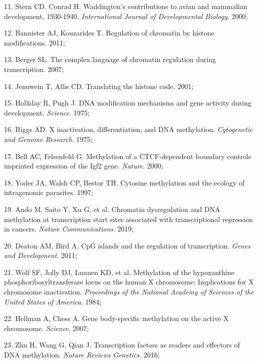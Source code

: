 \documentclass[11pt,twoside]{bristolthesis}
\newenvironment{cslreferences}%
  {}%
  {\par}
\begin{document}
\begin{cslreferences}
\leavevmode\hypertarget{ref-Stern2000}{}%
11. Stern CD. Conrad H. Waddington's contributions to avian and mammalian development, 1930-1940. \emph{International Journal of Developmental Biology}. 2000;

\leavevmode\hypertarget{ref-Bannister2011}{}%
12. Bannister AJ, Kouzarides T. Regulation of chromatin by histone modifications. 2011;

\leavevmode\hypertarget{ref-Berger2007}{}%
13. Berger SL. The complex language of chromatin regulation during transcription. 2007;

\leavevmode\hypertarget{ref-Jenuwein2001}{}%
14. Jenuwein T, Allis CD. Translating the histone code. 2001;

\leavevmode\hypertarget{ref-Holliday1975}{}%
15. Holliday R, Pugh J. DNA modification mechanisms and gene activity during development. \emph{Science}. 1975;

\leavevmode\hypertarget{ref-Riggs1975}{}%
16. Riggs AD. X inactivation, differentiation, and DNA methylation. \emph{Cytogenetic and Genome Research}. 1975;

\leavevmode\hypertarget{ref-Bell2000}{}%
17. Bell AC, Felsenfeld G. Methylation of a CTCF-dependent boundary controls imprinted expression of the Igf2 gene. \emph{Nature}. 2000;

\leavevmode\hypertarget{ref-Yoder1997}{}%
18. Yoder JA, Walsh CP, Bestor TH. Cytosine methylation and the ecology of intragenomic parasites. 1997;

\leavevmode\hypertarget{ref-Ando2019}{}%
19. Ando M, Saito Y, Xu G, et al. Chromatin dysregulation and DNA methylation at transcription start sites associated with transcriptional repression in cancers. \emph{Nature Communications}. 2019;

\leavevmode\hypertarget{ref-Deaton2011}{}%
20. Deaton AM, Bird A. CpG islands and the regulation of transcription. \emph{Genes and Development}. 2011;

\leavevmode\hypertarget{ref-Wolf1984}{}%
21. Wolf SF, Jolly DJ, Lunnen KD, et al. Methylation of the hypoxanthine phosphoribosyltransferase locus on the human X chromosome: Implications for X chromosome inactivation. \emph{Proceedings of the National Academy of Sciences of the United States of America}. 1984;

\leavevmode\hypertarget{ref-Hellman2007}{}%
22. Hellman A, Chess A. Gene body-specific methylation on the active X chromosome. \emph{Science}. 2007;

\leavevmode\hypertarget{ref-Zhu2016}{}%
23. Zhu H, Wang G, Qian J. Transcription factors as readers and effectors of DNA methylation. \emph{Nature Reviews Genetics}. 2016;


\end{cslreferences}
\end{document}

